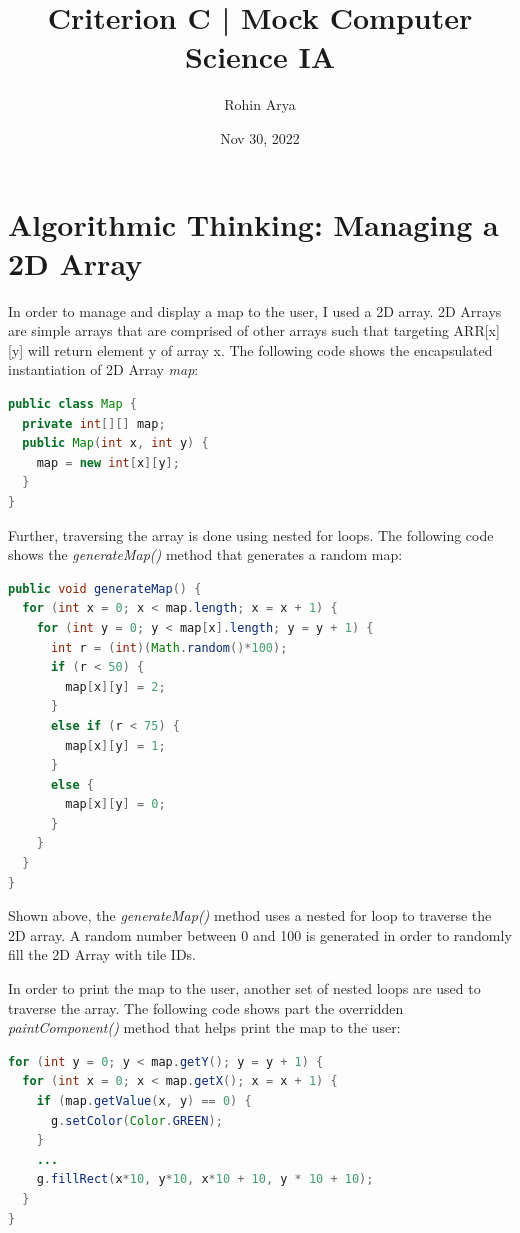 \documentclass[titlepage]{article}
\title{Criterion C | Mock Computer Science IA}
\author{Rohin Arya}
\date{Nov 30, 2022}
\begin{document}
\maketitle
\tableofcontents
\pagebreak

\section{Algorithmic Thinking: Managing a 2D Array}

In order to manage and display a map to the user, I used a 2D array. 2D Arrays are simple arrays that are comprised of other arrays such that targeting ARR[x][y] will return element y of array x. The following code shows the encapsulated instantiation of 2D Array \emph{map}:

\begin{lstlisting}[language=Java]
public class Map {
  private int[][] map;
  public Map(int x, int y) {
    map = new int[x][y];
  }
}
\end{lstlisting}

Further, traversing the array is done using nested for loops. The following code shows the \emph{generateMap()} method that generates a random map:

\begin{lstlisting}[language=Java]
public void generateMap() {
  for (int x = 0; x < map.length; x = x + 1) {
    for (int y = 0; y < map[x].length; y = y + 1) {
      int r = (int)(Math.random()*100);
      if (r < 50) {
        map[x][y] = 2;
      }
      else if (r < 75) {
        map[x][y] = 1;
      }
      else {
        map[x][y] = 0;
      }
    }
  }
}
\end{lstlisting}

Shown above, the \emph{generateMap()} method uses a nested for loop to traverse the 2D array. A random number between 0 and 100 is generated in order to randomly fill the 2D Array with tile IDs.

In order to print the map to the user, another set of nested loops are used to traverse the array. The following code shows part the overridden \emph{paintComponent()} method that helps print the map to the user:

\begin{lstlisting}[language=Java]
for (int y = 0; y < map.getY(); y = y + 1) {
  for (int x = 0; x < map.getX(); x = x + 1) {
    if (map.getValue(x, y) == 0) {
      g.setColor(Color.GREEN);
    }
    ...
    g.fillRect(x*10, y*10, x*10 + 10, y * 10 + 10);
  }
}
\end{lstlisting}
\end{document}
